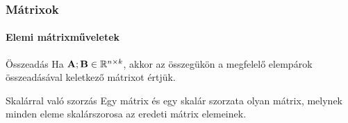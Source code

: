 \documentclass[xcolor={table}]{beamer}
\begin{document}
\begin{frame}
  \frametitle{Mátrixok}
  \framesubtitle{Elemi mátrixműveletek}

  \vfill

  \begin{block}{Összeadás}
    Ha $\mathbf{A}; \mathbf{B} \in \mathbb R^{n \times k}$, akkor az összegükön a
    megfelelő elempárok összeadásával keletkező mátrixot értjük.
  \end{block}

  \vfill

  \begin{block}{Skalárral való szorzás}
    Egy mátrix és egy skalár szorzata olyan mátrix, melynek minden eleme
    skalárszorosa az eredeti mátrix elemeinek.
  \end{block}

  \vfill
\end{frame}
\end{document}
